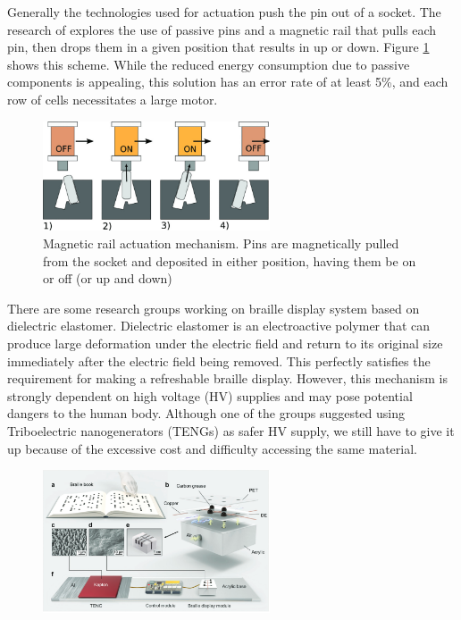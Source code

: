 Generally the technologies used for actuation push the pin out of a socket.
The research of \cite{loconsole_braillecursor_2019} explores the use of passive pins and a magnetic rail that pulls each pin, then drops them in a given position that results in up or down. Figure \ref{fig:magnetic-rail} shows this scheme.
While the reduced energy consumption due to passive components is appealing, this solution has an error rate of at least 5\%, and each row of cells necessitates a large motor.
\begin{figure}
\centering
    \includegraphics[width=0.6\textwidth]{figures/magnetic-rail.jpg}
\caption{Magnetic rail actuation mechanism. Pins are magnetically pulled from the socket and deposited in either position, having them be on or off (or up and down)}
\label{fig:magnetic-rail}
\end{figure}  

There are some research groups working on braille display system based on dielectric elastomer. Dielectric elastomer is an electroactive polymer that can produce large deformation under the electric field and return to its original size immediately after the electric field being removed. This perfectly satisfies the requirement for making a refreshable braille display. However, this mechanism is strongly dependent on high voltage (HV) supplies and may pose potential dangers to the human body. Although one of the groups suggested using Triboelectric nanogenerators (TENGs) as safer HV supply, we still have to give it up because of the excessive cost and difficulty accessing the same material. 

\begin{figure}\centering
    \includegraphics[width=0.6\textwidth]{figures/teng.png}
\caption{}
\label{fig:teng.png}
\end{figure}

